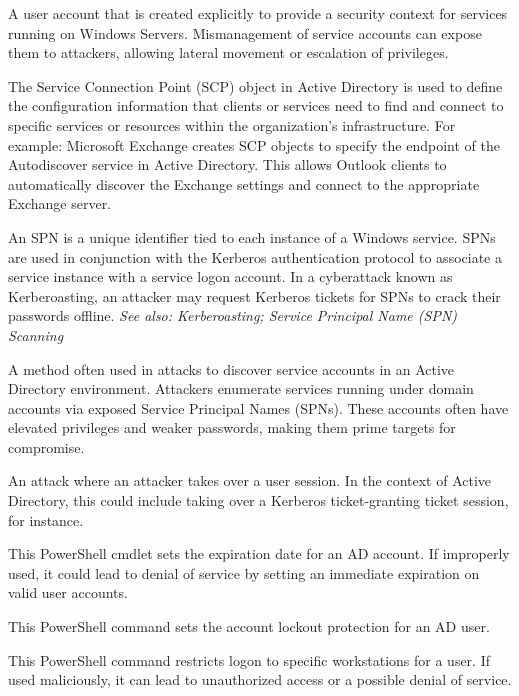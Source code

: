  A user account that is created explicitly to provide a security context for services running on Windows Servers. Mismanagement of service accounts can expose them to attackers, allowing lateral movement or escalation of privileges.

 The Service Connection Point (SCP) object in Active Directory is used to define the configuration information that clients or services need to find and connect to specific services or resources within the organization’s infrastructure. For example: Microsoft Exchange creates SCP objects to specify the endpoint of the Autodiscover service in Active Directory. This allows Outlook clients to automatically discover the Exchange settings and connect to the appropriate Exchange server.

 An SPN is a unique identifier tied to each instance of a Windows service. SPNs are used in conjunction with the Kerberos authentication protocol to associate a service instance with a service logon account. In a cyberattack known as Kerberoasting, an attacker may request Kerberos tickets for SPNs to crack their passwords offline.
\textit{See also: Kerberoasting; Service Principal Name (SPN) Scanning}

 A method often used in attacks to discover service accounts in an Active Directory environment. Attackers enumerate services running under domain accounts via exposed Service Principal Names (SPNs). These accounts often have elevated privileges and weaker passwords, making them prime targets for compromise.

 An attack where an attacker takes over a user session. In the context of Active Directory, this could include taking over a Kerberos ticket-granting ticket session, for instance.

 This PowerShell cmdlet sets the expiration date for an AD account. If improperly used, it could lead to denial of service by setting an immediate expiration on valid user accounts.

 This PowerShell command sets the account lockout protection for an AD user.

 This PowerShell command restricts logon to specific workstations for a user. If used maliciously, it can lead to unauthorized access or a possible denial of service.

